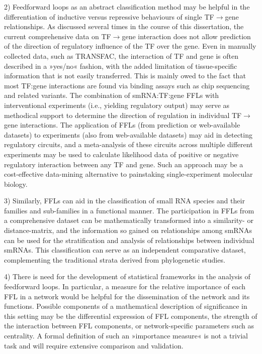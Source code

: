 2) Feedforward loops as an abstract classification method may be helpful in the differentiation of inductive versus repressive behaviours of single TF$\to$gene relationships. As discussed several times in the course of this dissertation, the current comprehensive data on TF$\to$gene interaction does not allow prediction of the direction of regulatory influence of the TF over the gene. Even in manually collected data, such as TRANSFAC, the interaction of TF and gene is often described in a »yes/no« fashion, with the added limitation of tissue-specific information that is not easily transferred. This is mainly owed to the fact that most TF:gene interactions are found via binding assays such as \ac{chip} sequencing and related variants. The combination of smRNA:TF:gene FFLs with interventional experiments (i.e., yielding regulatory output) may serve as methodical support to determine the direction of regulation in individual TF$\to$gene interactions. The application of FFLs (from prediction or web-available datasets) to experiments (also from web-available datasets) may aid in detecting regulatory circuits, and a meta-analysis of these circuits across multiple different experiments may be used to calculate likelihood data of positive or negative regulatory interaction between any TF and gene. Such an approach may be a cost-effective data-mining alternative to painstaking single-experiment molecular biology.

3) Similarly, FFLs can aid in the classification of small RNA species and their families and sub-families in a functional manner. The participation in FFLs from a comprehensive dataset can be mathematically transformed into a similarity- or distance-matrix, and the information so gained on relationships among smRNAs can be used for the stratification and analysis of relationships between individual smRNAs. This classification can serve as an independent comparative dataset, complementing the traditional strata derived from phylogenetic studies.

4) There is need for the development of statistical frameworks in the analysis of feedforward loops. In particular, a measure for the relative importance of each FFL in a network would be helpful for the dissemination of the network and its functions. Possible components of a mathematical description of significance in this setting may be the differential expression of FFL components, the strength of the interaction between FFL components, or network-specific parameters such as centrality. A formal definition of such an »importance measure« is not a trivial task and will require extensive comparison and validation.

\newpage